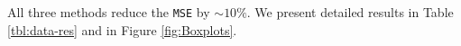 \documentclass[preprint]{imsart}
\numberwithin{equation}{section}
\theoremstyle{plain}
\DeclareMathOperator*{\diag}{diag}
\begin{document}
All three methods reduce the \verb|MSE| by $\sim 10\%$. We present detailed results in Table \ref{tbl:data-res} and in Figure \ref{fig:Boxplots}. 








\end{document}
